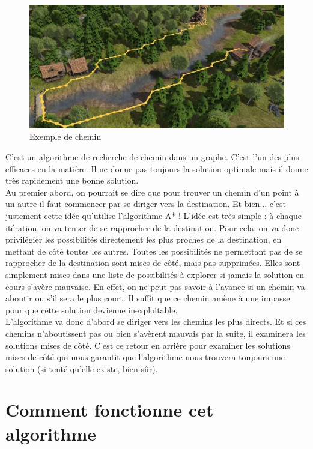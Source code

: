 \begin{figure}[!h]
\centering
\includegraphics[scale=0.5]{images/jeuVideo.jpg}
\caption{Exemple de chemin}
\end{figure}

C'est un algorithme de recherche de chemin dans un graphe. C'est l'un des plus efficaces en la matière. Il ne donne pas toujours la solution optimale mais il donne très rapidement une bonne solution.\\
Au premier abord, on pourrait se dire que pour trouver un chemin d'un point à un autre il faut commencer par se diriger vers la destination. Et bien... c'est justement cette idée qu'utilise l'algorithme A* ! L'idée est très simple : à chaque itération, on va tenter de se rapprocher de la destination. Pour cela, on va donc privilégier les possibilités directement les plus proches de la destination, en mettant de côté toutes les autres. Toutes les possibilités ne permettant pas de se rapprocher de la destination sont mises de côté, mais pas supprimées. Elles
sont simplement mises dans une liste de possibilités à explorer si jamais la solution en cours s'avère mauvaise.
En effet, on ne peut pas savoir à l'avance si un chemin va aboutir ou s'il sera le plus court. Il suffit que ce chemin amène à une impasse pour que cette solution devienne inexploitable.\\
L'algorithme va donc d'abord se diriger vers les chemins les plus directs. Et si ces chemins n'aboutissent pas ou bien s'avèrent mauvais par la suite, il examinera les solutions mises de côté. C'est ce retour en arrière pour examiner les solutions mises de côté qui nous garantit que l'algorithme nous trouvera toujours une solution (si
tenté qu'elle existe, bien sûr).


\section{Comment fonctionne cet algorithme}

